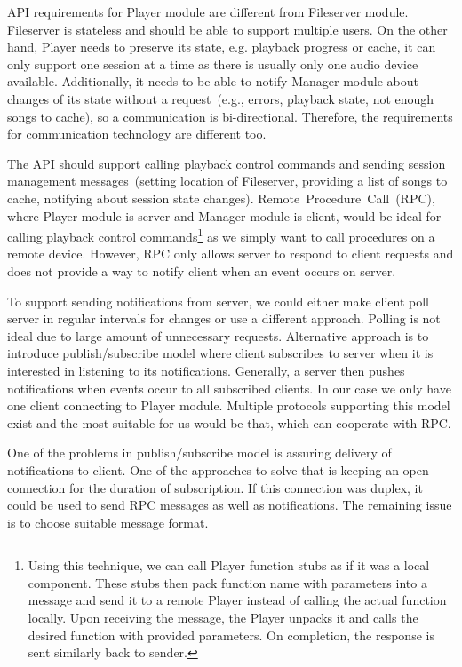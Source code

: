 API requirements for Player module are different from Fileserver module. Fileserver is stateless and should be able to support multiple users. On the other hand, Player needs to preserve its state, e.g. playback progress or cache, it can only support one session at a time as there is usually only one audio device available. Additionally, it needs to be able to notify Manager module about changes of its state without a request~(e.g., errors, playback state, not enough songs to cache), so a communication is bi-directional. Therefore, the requirements for communication technology are different too.
\par
The API should support calling playback control commands and sending session management messages~(setting location of Fileserver, providing a list of songs to cache, notifying about session state changes). Remote~Procedure~Call~(RPC), where Player module is server and Manager module is client, would be ideal for calling playback control commands\footnote{Using this technique, we can call Player function stubs as if it was a local component. These stubs then pack function name with parameters into a message and send it to a remote Player instead of calling the actual function locally. Upon receiving the message, the Player unpacks it and calls the desired function with provided parameters. On completion, the response is sent similarly back to sender.} as we simply want to call procedures on a remote device. However, RPC only allows server to respond to client requests and does not provide a way to notify client when an event occurs on server.
\par
To support sending notifications from server, we could either make client poll server in regular intervals for changes or use a different approach. Polling is not ideal due to large amount of unnecessary requests. Alternative approach is to introduce publish/subscribe model where client subscribes to server when it is interested in listening to its notifications. Generally, a server then pushes notifications when events occur to all subscribed clients. In our case we only have one client connecting to Player module. Multiple protocols supporting this model exist and the most suitable for us would be that, which can cooperate with RPC.
\par
One of the problems in publish/subscribe model is assuring delivery of notifications to client. One of the approaches to solve that is keeping an open connection for the duration of subscription. If this connection was duplex, it could be used to send RPC messages as well as notifications. The remaining issue is to choose suitable message format.
